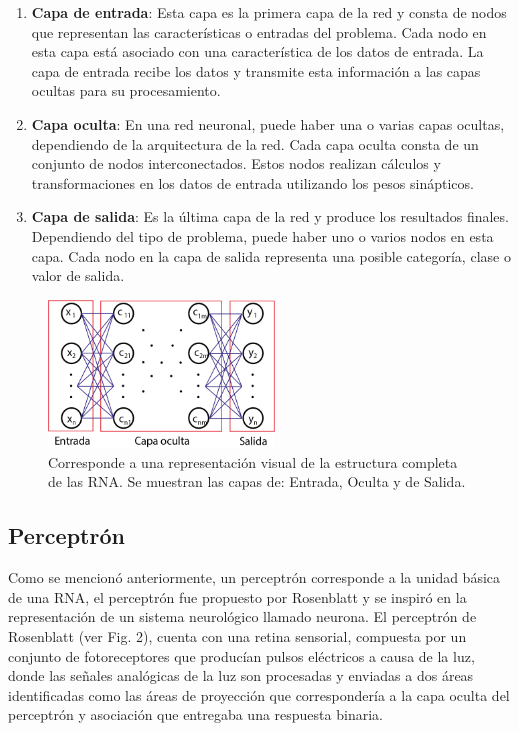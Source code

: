\documentclass[journal]{IEEEtai}
\begin{document}
\begin{enumerate}
\item	\textbf{Capa de entrada}: Esta capa es la primera capa de la red y consta de nodos que representan las características o entradas del problema. Cada nodo en esta capa está asociado con una característica de los datos de entrada. La capa de entrada recibe los datos y transmite esta información a las capas ocultas para su procesamiento.
\item	\textbf{Capa oculta}: En una red neuronal, puede haber una o varias capas ocultas, dependiendo de la arquitectura de la red. Cada capa oculta consta de un conjunto de nodos interconectados. Estos nodos realizan cálculos y transformaciones en los datos de entrada utilizando los pesos sinápticos. 
\item	\textbf{Capa de salida}: Es la última capa de la red y produce los resultados finales. Dependiendo del tipo de problema, puede haber uno o varios nodos en esta capa. Cada nodo en la capa de salida representa una posible categoría, clase o valor de salida. 
\end{enumerate}

\begin{figure}[h!]
\centering
\includegraphics[width=6cm]{img/FIGURAS/RNA.png}
\caption{Corresponde a una representación visual de la estructura completa de las RNA. Se muestran las capas de: Entrada, Oculta y de Salida.}
\label{fig: Capas RNA}
\end{figure}

\subsection{Perceptrón}

Como se mencionó anteriormente, un perceptrón corresponde a la unidad básica de una RNA, el perceptrón fue propuesto por Rosenblatt \cite{Rosenblatt} y se inspiró en la representación de un sistema neurológico llamado neurona. El perceptrón de Rosenblatt (ver Fig. 2), cuenta con una retina sensorial, compuesta por un conjunto de fotoreceptores que producían pulsos eléctricos a causa de la luz, donde las señales analógicas de la luz son procesadas y enviadas a dos áreas identificadas como las áreas de proyección que correspondería a la capa oculta del perceptrón y asociación que entregaba una respuesta binaria.
\end{document}
